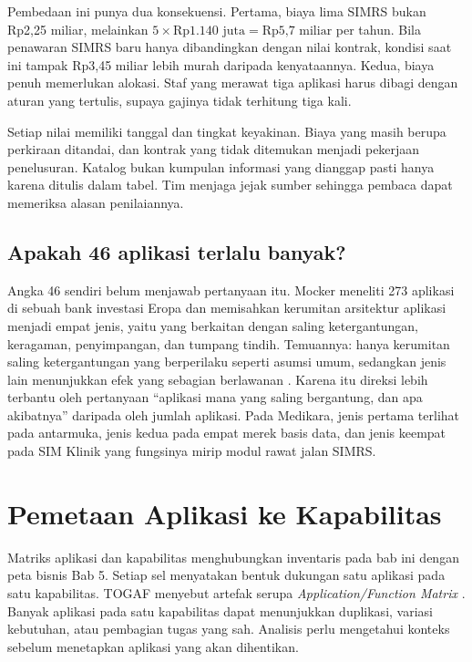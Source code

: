 Pembedaan ini punya dua konsekuensi. Pertama, biaya lima SIMRS bukan Rp2,25 miliar, melainkan
$5 \times \text{Rp1.140 juta} = \text{Rp5,7 miliar}$ per tahun. Bila penawaran SIMRS baru hanya
dibandingkan dengan nilai kontrak, kondisi saat ini tampak Rp3,45 miliar lebih murah daripada
kenyataannya. Kedua, biaya penuh memerlukan alokasi. Staf yang merawat tiga aplikasi harus dibagi
dengan aturan yang tertulis, supaya gajinya tidak terhitung tiga kali.

Setiap nilai memiliki tanggal dan tingkat keyakinan. Biaya yang masih berupa perkiraan ditandai,
dan kontrak yang tidak ditemukan menjadi pekerjaan penelusuran. Katalog bukan kumpulan informasi
yang dianggap pasti hanya karena ditulis dalam tabel. Tim menjaga jejak sumber sehingga pembaca
dapat memeriksa alasan penilaiannya.

\subsection*{Apakah 46 aplikasi terlalu banyak?}

Angka 46 sendiri belum menjawab pertanyaan itu. Mocker meneliti 273 aplikasi di sebuah bank
investasi Eropa dan memisahkan kerumitan arsitektur aplikasi menjadi empat jenis, yaitu yang
berkaitan dengan saling ketergantungan, keragaman, penyimpangan, dan tumpang tindih. Temuannya:
hanya kerumitan saling ketergantungan yang berperilaku seperti asumsi umum, sedangkan jenis lain
menunjukkan efek yang sebagian berlawanan \cite{c07-mocker2009}. Karena itu direksi lebih terbantu
oleh pertanyaan ``aplikasi mana yang saling bergantung, dan apa akibatnya'' daripada oleh jumlah
aplikasi. Pada Medikara, jenis pertama terlihat pada antarmuka, jenis kedua pada empat merek basis
data, dan jenis keempat pada SIM Klinik yang fungsinya mirip modul rawat jalan SIMRS.

\section{Pemetaan Aplikasi ke Kapabilitas}

Matriks aplikasi dan kapabilitas menghubungkan inventaris pada bab ini dengan peta bisnis Bab 5.
Setiap sel menyatakan bentuk dukungan satu aplikasi pada satu kapabilitas. TOGAF menyebut artefak
serupa \textit{Application/Function Matrix} \cite{togaf10}. Banyak aplikasi pada satu kapabilitas
dapat menunjukkan duplikasi, variasi kebutuhan, atau pembagian tugas yang sah. Analisis perlu
mengetahui konteks sebelum menetapkan aplikasi yang akan dihentikan.

